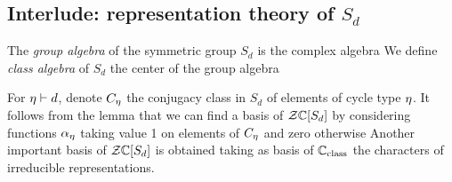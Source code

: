 \documentclass[10pt]{beamer}
\begin{document}
\subsection{Interlude: representation theory of $S_d$}

\begin{frame}

\begin{definition}
	The \emph{group algebra} of the symmetric group $S_d$ is the complex algebra
	We define \emph{class algebra} of $S_d$ the center of the group algebra
\end{definition}


\end{frame}

\begin{frame}

\begin{lemma}
\end{lemma}

For $\eta\vdash d$, denote $C_\eta$ the conjugacy class in $S_d$ of elements of cycle type $\eta$. It follows from the lemma that we can find a basis of $\mathcal Z\mathbb C[S_d]$ by considering functions $\alpha_\eta$ taking value 1 on elements of $C_\eta$ and zero otherwise
Another important basis of $\mathcal Z\mathbb C[S_d]$ is obtained taking as basis of $\mathbb C_{\text{class}}$ the characters of irreducible representations. 

\end{frame}
\end{document}

